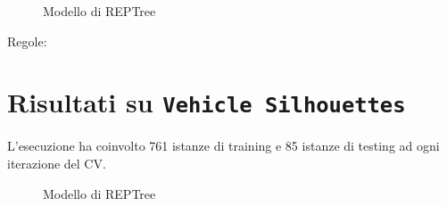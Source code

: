 \begin{mdframed}[frametitle=Esecuzione NaiveBayesSimple]
	\footnotesize
\end{mdframed}


\scriptsize

\begin{mdframed}[frametitle=Esecuzione REPTree]
	\footnotesize
\end{mdframed}


\begin{figure}[htb]
	\caption{Modello di REPTree}
\end{figure}

\begin{mdframed}[frametitle=Esecuzione JRip]
	\footnotesize
\end{mdframed}


\noindent
\normalsize Regole:
\footnotesize

\pagebreak

\section{Risultati su \texttt{Vehicle Silhouettes}}

\normalsize L'esecuzione ha coinvolto 761 istanze di training e 85 istanze di testing ad ogni iterazione del CV.

\begin{mdframed}[frametitle=Esecuzione NaiveBayesSimple]
	\footnotesize
\end{mdframed}


\scriptsize

\begin{mdframed}[frametitle=Esecuzione REPTree]
	\scriptsize
\end{mdframed}


\begin{figure}[htb]
	\caption{Modello di REPTree}
\end{figure}

\begin{mdframed}[frametitle=Esecuzione JRip]
	\scriptsize
\end{mdframed}


